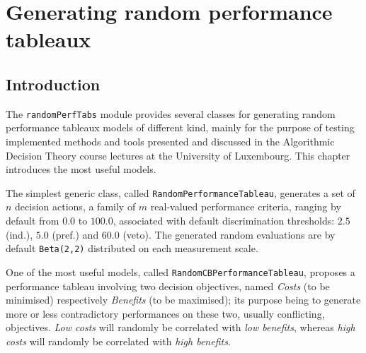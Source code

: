 \chapter{Generating random performance tableaux}
\label{sec:6}



\section{Introduction}
\label{sec:6.1}

The \texttt{randomPerfTabs} module provides several classes for generating random performance tableaux models of different kind, mainly for the purpose of testing implemented methods and tools presented and discussed in the Algorithmic Decision Theory course lectures at the University of Luxembourg. This chapter introduces the most useful models.

The simplest generic class, called \texttt{RandomPerformanceTableau}, generates a set of $n$ decision actions, a family of $m$ real-valued performance criteria, ranging by default from $0.0$ to $100.0$, associated with default discrimination thresholds: $2.5$ (ind.), $5.0$ (pref.) and $60.0$ (veto). The generated random evaluations are by default \texttt{Beta(2,2)} distributed on each measurement scale.

One of the most useful models, called \texttt{RandomCBPerformanceTableau}\index{}, proposes a performance tableau involving two decision objectives, named \emph{Costs} (to be minimised) respectively \emph{Benefits} (to be maximised); its purpose being to generate more or less contradictory performances on these two, usually conflicting, objectives. \emph{Low costs} will randomly be correlated with \emph{low benefits}, whereas \emph{high costs} will randomly be correlated with \emph{high benefits}.

